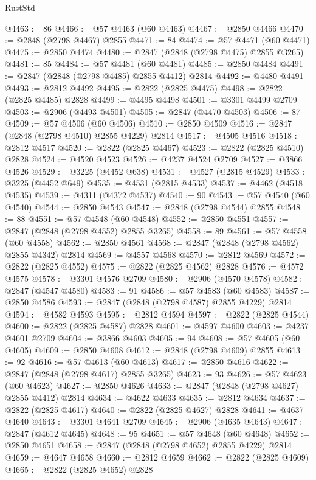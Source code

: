 \begin{lexlean}{RustStd}
\begin{coremodule}
@4463 := 86
@4466 := @57 @4463 (@60 @4463)
@4467 := @2850 @4466
@4470 := @2848 (@2798 @4467) @2855
@4471 := 84
@4474 := @57 @4471 (@60 @4471)
@4475 := @2850 @4474
@4480 := @2847 (@2848 (@2798 @4475) @2855 @3265)
@4481 := 85
@4484 := @57 @4481 (@60 @4481)
@4485 := @2850 @4484
@4491 := @2847 (@2848 (@2798 @4485) @2855 @4412) @2814
@4492 := @4480 @4491
@4493 := @2812 @4492
@4495 := @2822 (@2825 @4475)
@4498 := @2822 (@2825 @4485) @2828
@4499 := @4495 @4498
@4501 := @3301 @4499 @2709
@4503 := @2906 (@4493 @4501)
@4505 := @2847 (@4470 @4503)
@4506 := 87
@4509 := @57 @4506 (@60 @4506)
@4510 := @2850 @4509
@4516 := @2847 (@2848 (@2798 @4510) @2855 @4229) @2814
@4517 := @4505 @4516
@4518 := @2812 @4517
@4520 := @2822 (@2825 @4467)
@4523 := @2822 (@2825 @4510) @2828
@4524 := @4520 @4523
@4526 := @4237 @4524 @2709
@4527 := @3866 @4526
@4529 := @3225 (@4452 @638)
@4531 := @4527 (@2815 @4529)
@4533 := @3225 (@4452 @649)
@4535 := @4531 (@2815 @4533)
@4537 := @4462 (@4518 @4535)
@4539 := @4311 (@4372 @4537)
@4540 := 90
@4543 := @57 @4540 (@60 @4540)
@4544 := @2850 @4543
@4547 := @2848 (@2798 @4544) @2855
@4548 := 88
@4551 := @57 @4548 (@60 @4548)
@4552 := @2850 @4551
@4557 := @2847 (@2848 (@2798 @4552) @2855 @3265)
@4558 := 89
@4561 := @57 @4558 (@60 @4558)
@4562 := @2850 @4561
@4568 := @2847 (@2848 (@2798 @4562) @2855 @4342) @2814
@4569 := @4557 @4568
@4570 := @2812 @4569
@4572 := @2822 (@2825 @4552)
@4575 := @2822 (@2825 @4562) @2828
@4576 := @4572 @4575
@4578 := @3301 @4576 @2709
@4580 := @2906 (@4570 @4578)
@4582 := @2847 (@4547 @4580)
@4583 := 91
@4586 := @57 @4583 (@60 @4583)
@4587 := @2850 @4586
@4593 := @2847 (@2848 (@2798 @4587) @2855 @4229) @2814
@4594 := @4582 @4593
@4595 := @2812 @4594
@4597 := @2822 (@2825 @4544)
@4600 := @2822 (@2825 @4587) @2828
@4601 := @4597 @4600
@4603 := @4237 @4601 @2709
@4604 := @3866 @4603
@4605 := 94
@4608 := @57 @4605 (@60 @4605)
@4609 := @2850 @4608
@4612 := @2848 (@2798 @4609) @2855
@4613 := 92
@4616 := @57 @4613 (@60 @4613)
@4617 := @2850 @4616
@4622 := @2847 (@2848 (@2798 @4617) @2855 @3265)
@4623 := 93
@4626 := @57 @4623 (@60 @4623)
@4627 := @2850 @4626
@4633 := @2847 (@2848 (@2798 @4627) @2855 @4412) @2814
@4634 := @4622 @4633
@4635 := @2812 @4634
@4637 := @2822 (@2825 @4617)
@4640 := @2822 (@2825 @4627) @2828
@4641 := @4637 @4640
@4643 := @3301 @4641 @2709
@4645 := @2906 (@4635 @4643)
@4647 := @2847 (@4612 @4645)
@4648 := 95
@4651 := @57 @4648 (@60 @4648)
@4652 := @2850 @4651
@4658 := @2847 (@2848 (@2798 @4652) @2855 @4229) @2814
@4659 := @4647 @4658
@4660 := @2812 @4659
@4662 := @2822 (@2825 @4609)
@4665 := @2822 (@2825 @4652) @2828

\end{coremodule}
\end{lexlean}
